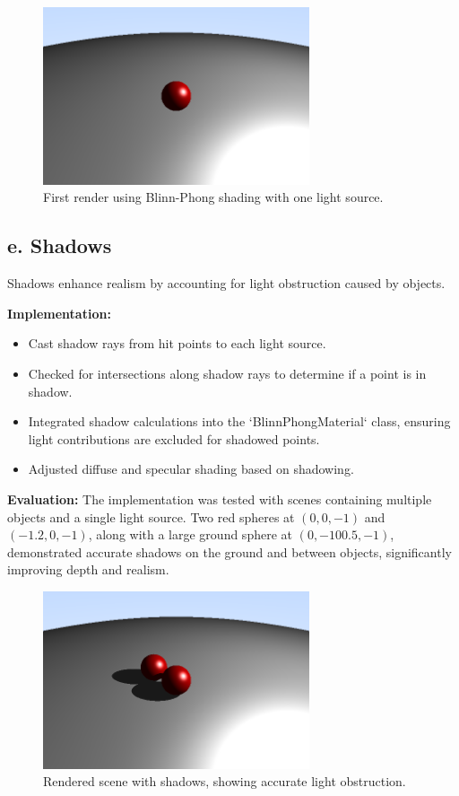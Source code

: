 \documentclass[11pt,a4paper]{article}
\begin{document}
\begin{figure}[H]  
\centering  
\includegraphics[width=0.7\textwidth]{first_blinn.png}  
\caption{First render using Blinn-Phong shading with one light source.}  
\label{fig:blinn-phong-first}  
\end{figure}

\subsection{e. Shadows}  
\label{sec:shadows}

Shadows enhance realism by accounting for light obstruction caused by objects.

\noindent\textbf{Implementation:}  
\begin{itemize}
    \item Cast shadow rays from hit points to each light source.  
    \item Checked for intersections along shadow rays to determine if a point is in shadow.  
    \item Integrated shadow calculations into the `BlinnPhongMaterial` class, ensuring light contributions are excluded for shadowed points.  
    \item Adjusted diffuse and specular shading based on shadowing.  
\end{itemize}

\noindent\textbf{Evaluation:}  
The implementation was tested with scenes containing multiple objects and a single light source. Two red spheres at \((0, 0, -1)\) and \((-1.2, 0, -1)\), along with a large ground sphere at \((0, -100.5, -1)\), demonstrated accurate shadows on the ground and between objects, significantly improving depth and realism.  

\begin{figure}[H]  
\centering  
\includegraphics[width=0.7\textwidth]{first_shadow.png}  
\caption{Rendered scene with shadows, showing accurate light obstruction.}  
\label{fig:shadows}  
\end{figure}  
\end{document}
